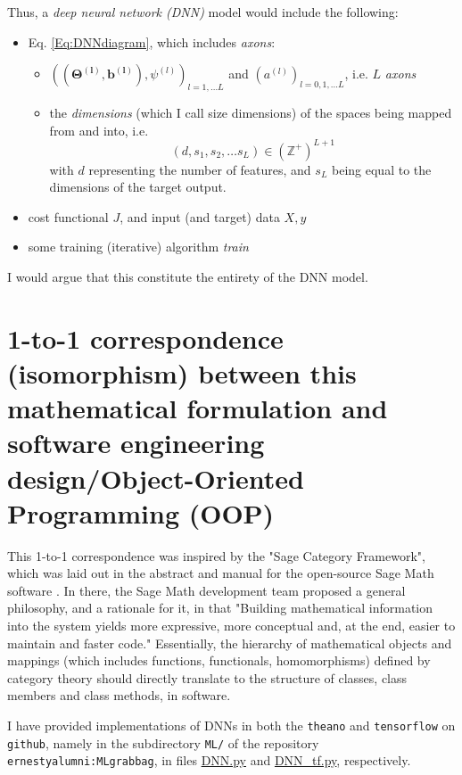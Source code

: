 \documentclass[10pt]{amsart}
\begin{document}
Thus, a \emph{deep neural network (DNN)} model would include the following:  
\begin{itemize}
\item Eq. \ref{Eq:DNNdiagram}, which includes \emph{axons}:  
   \begin{itemize}
\item $( (\mathbf{\Theta^{(l)},b^{(l)}}), \psi^{(l)} )_{l=1,\dots L}$ and $(a^{(l)})_{l=0,1,\dots L}$, i.e. $L$ \emph{axons}
\item the \emph{dimensions} (which I call size dimensions) of the spaces being mapped from and into, i.e. 
\begin{equation}
	(d,s_1,s_2,\dots s_L) \in (\mathbb{Z}^+)^{L+1}
\end{equation}
with $d$ representing the number of features, and $s_L$ being equal to the dimensions of the target output.  
\end{itemize}
\item cost functional $J$, and input (and target) data $X,y$
\item some training (iterative) algorithm \emph{train}
\end{itemize}  
I would argue that this constitute the entirety of the DNN model.  

\section{1-to-1 correspondence (isomorphism) between this mathematical formulation and software engineering design/Object-Oriented Programming (OOP)}  

This 1-to-1 correspondence was inspired by the "Sage Category Framework", which was laid out in the abstract and manual for the open-source Sage Math software \cite{SageMath2017}.  In there, the Sage Math development team proposed a general philosophy, and a rationale for it, in that "Building mathematical information into the system yields more expressive, more conceptual and, at the end, easier to maintain and faster code."  Essentially, the hierarchy of mathematical objects and mappings (which includes functions, functionals, homomorphisms) defined by category theory should directly translate to the structure of classes, class members and class methods, in software.  

I have provided implementations of DNNs in both the \verb|theano|\cite{theano} and \verb|tensorflow|\cite{tensorflow2015} on \verb|github|, namely in the subdirectory \verb|ML/| of the repository \verb|ernestyalumni:MLgrabbag|, in files \href{https://github.com/ernestyalumni/MLgrabbag/blob/master/ML/DNN.py}{DNN.py} and \href{https://github.com/ernestyalumni/MLgrabbag/blob/master/ML/DNN_tf.py}{DNN_tf.py}, respectively.  
\end{document}
